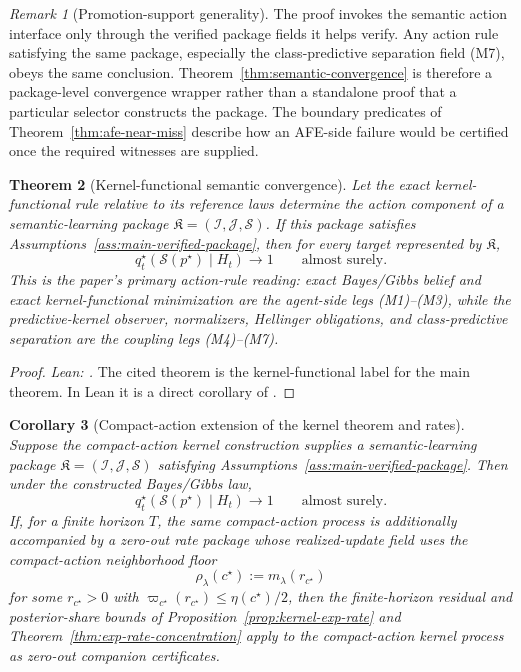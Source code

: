 \documentclass[11pt]{article}
\newtheorem{theorem}{Theorem}[section]
\newtheorem{corollary}[theorem]{Corollary}
\theoremstyle{definition}
\theoremstyle{remark}
\newtheorem{remark}[theorem]{Remark}
\theoremstyle{plain}
\theoremstyle{definition}
\newcommand{\Scal}{\mathcal{S}}
\begin{document}
\begin{remark}[Promotion-support generality]
\label{rem:promotion-support}
The proof invokes the semantic action interface only through the verified package fields it helps verify. Any action rule satisfying the same package, especially the class-predictive separation field \textup{(M7)}, obeys the same conclusion. Theorem~\ref{thm:semantic-convergence} is therefore a package-level convergence wrapper rather than a standalone proof that a particular selector constructs the package. The boundary predicates of Theorem~\ref{thm:afe-near-miss} describe how an AFE-side failure would be certified once the required witnesses are supplied.
\end{remark}

\begin{theorem}[Kernel-functional semantic convergence]
\label{thm:kernel-semantic-convergence}
Let the exact kernel-functional rule relative to its reference laws determine the action component of a semantic-learning package $\mathfrak K=(\mathcal I,\mathcal J,\Scal)$. If this package satisfies Assumptions~\ref{ass:main-verified-package}, then for every target represented by $\mathfrak K$,
\[
q_t^\star(\Scal(p^\star)\mid H_t)\longrightarrow 1
\qquad
\text{almost surely.}
\]
This is the paper's primary action-rule reading: exact Bayes/Gibbs belief and exact kernel-functional minimization are the agent-side legs \textup{(M1)--(M3)}, while the predictive-kernel observer, normalizers, Hellinger obligations, and class-predictive separation are the coupling legs \textup{(M4)--(M7)}.
\end{theorem}

\begin{proof}
\noindent\emph{Lean: .}
The cited theorem is the kernel-functional label for the main theorem. In Lean it is a direct corollary of .
\end{proof}

\begin{corollary}[Compact-action extension of the kernel theorem and rates]
\label{cor:compact-action-kernel}
Suppose the compact-action kernel construction supplies a semantic-learning package $\mathfrak K=(\mathcal I,\mathcal J,\Scal)$ satisfying Assumptions~\ref{ass:main-verified-package}. Then under the constructed Bayes/Gibbs law,
\[
q_t^\star(\Scal(p^\star)\mid H_t)\longrightarrow 1
\qquad\text{almost surely.}
\]
If, for a finite horizon $T$, the same compact-action process is additionally accompanied by a zero-out rate package whose realized-update field uses the compact-action neighborhood floor
\[
\rho_\lambda(c^\star):=m_\lambda(r_{c^\star})
\]
for some $r_{c^\star}>0$ with $\varpi_{c^\star}(r_{c^\star})\le \eta(c^\star)/2$, then the finite-horizon residual and posterior-share bounds of Proposition~\ref{prop:kernel-exp-rate} and Theorem~\ref{thm:exp-rate-concentration} apply to the compact-action kernel process as zero-out companion certificates.
\end{corollary}
\end{document}
